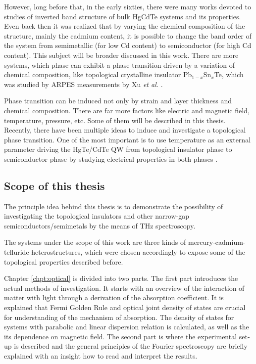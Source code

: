 \documentclass[titlepage,a4paper]{book}
\newcommand{\wciecie}{\quad\phantom{v}}
\begin{document}
However, long before that, in the early sixties, there were many works devoted to studies of inverted band structure of bulk HgCdTe systems and its properties. Even back then it was realized that by varying the chemical composition of the structure, mainly the cadmium content, it is possible to change the band order of the system from semimetallic (for low Cd content) to semiconductor (for high Cd content). This subject will be broader discussed in this work. There are more systems, which phase can exhibit a phase transition driven by a variation of chemical composition, like topological crystalline insulator Pb$_{1-x}$Sn$_{x}$Te, which was studied by ARPES measurements by Xu \textit{et al.} \cite{Xu_CTI}.

Phase transition can be induced not only by strain and layer thickness and chemical composition. There are far more factors like electric and magnetic field, temperature, pressure, etc. Some of them will be described in this thesis. Recently, there have been multiple ideas to induce and investigate a topological phase transition. One of the most important is to use temperature as an external parameter driving the HgTe/CdTe QW from topological insulator phase to semiconductor phase by studying electrical properties in both phases \cite{Wiedmann_State}. 

\subsection{Scope of this thesis}
\wciecie
The principle idea behind this thesis is to demonstrate the possibility of investigating the topological insulators and other narrow-gap semiconductors/semimetals by the means of THz spectroscopy. 

The systems under the scope of this work are three kinds of mercury-cadmium-telluride heterostructures, which were chosen accordingly to expose some of the topological properties described before.

Chapter \ref{chpt:optical} is divided into two parts. The first part introduces the actual methods of investigation. It starts with an overview of the interaction of matter with light through a derivation of the absorption coefficient. It is explained that Fermi Golden Rule and optical joint density of states are crucial for understanding of the mechanism of absorption. The density of states for systems with parabolic and linear dispersion relation is calculated, as well as the its dependence on magnetic field. The second part is where the experimental set-up is described and the general principles of the Fourier spectroscopy are briefly explained with an insight how to read and interpret the results.  
\end{document}
